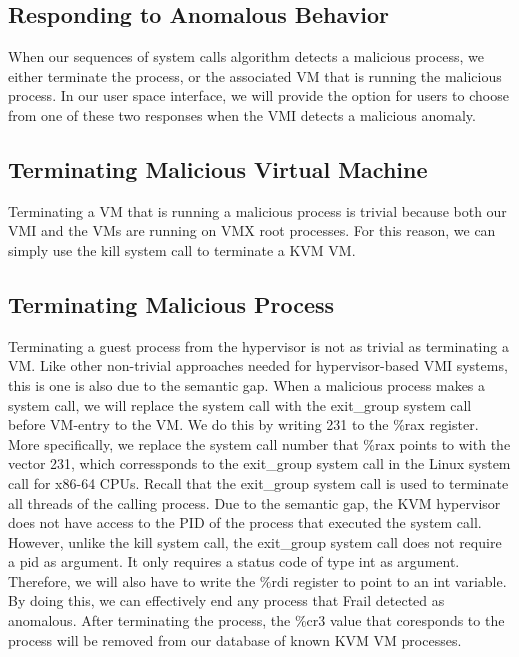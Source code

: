 \documentclass{report}
\begin{document}
\begin{spacing}{1.5}
\section{Responding to Anomalous Behavior}

{\large
When our sequences of system calls algorithm detects a malicious process, we either terminate the process, or the associated VM that is running the malicious process. In our user space interface, we will provide the option for users to choose from one of these two responses when the VMI detects a malicious anomaly. 
\newline
}

\subsection{Terminating Malicious Virtual Machine}

{\large
Terminating a VM that is running a malicious process is trivial because both our VMI and the VMs are running on VMX root processes. For this reason, we can simply use the kill system call to terminate a KVM VM. 
\newline
}

\subsection{Terminating Malicious Process}


{\large
Terminating a guest process from the hypervisor is not as trivial as terminating a VM. Like other non-trivial approaches needed for hypervisor-based VMI systems, this is one is also due to the semantic gap. When a malicious process makes a system call, we will replace the system call with the exit\_group system call before VM-entry to the VM. We do this by writing 231 to the \%rax register. More specifically, we replace the system call number that \%rax points to with the vector 231, which corressponds to the exit\_group system call in the Linux system call for x86-64 CPUs. Recall that the exit\_group system call is used to terminate all threads of the calling process. Due to the semantic gap, the KVM hypervisor does not have access to the PID of the process that executed the system call. However, unlike the kill system call, the exit\_group system call does not require a pid as argument. It only requires a status code of type int as argument. Therefore, we will also have to write the \%rdi register to point to an int variable. By doing this, we can effectively end any process that Frail detected as anomalous. After terminating the process, the \%cr3 value that coresponds to the process will be removed from our database of known KVM VM processes.
\newline
}












\end{spacing}
\end{document}

